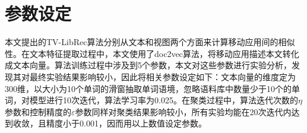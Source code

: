 



\section{参数设定}
本文提出的TV-LibRec算法分别从文本和视图两个方面来计算移动应用间的相似性。在文本特征提取过程中，本文使用了doc2vec算法，将移动应用描述本文转化成文本向量。算法训练过程中涉及到5个参数，本文对这些参数进行实验分析，发现其对最终实验结果影响较小，因此将相关参数设定如下：文本向量的维度定为300维，以大小为10个单词的滑窗抽取单词语境，忽略语料库中数量少于10个的单词，对模型进行10次迭代，算法学习率为0.025。在聚类过程中，算法迭代次数的$\eta$参数和控制精度的$\varepsilon$参数同样对聚类结果影响较小，所有实验均能在20次迭代内达到收敛，且精度小于0.001，因而用以上数值设定参数。



